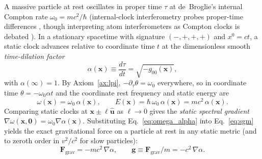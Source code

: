 \documentclass[aps,prd,onecolumn,tightenlines,nofootinbib,notitlepage,10pt,floatfix]{revtex4-2}
\theoremstyle{indentedtheorem}
\begin{document}
A massive particle at rest oscillates in proper time $\tau$ at de~Broglie's internal Compton rate $\omega_0=mc^2/\hbar$ \citep{Compton1923Quantum,deBroglie1925Thesis} (internal-clock interferometry probes proper-time differences \citep{Zych2011Quantum}, though interpreting atom interferometers as Compton clocks is debated \citep{Lan2013Clock,Wolf2011,SinhaSamuel2011}). In a stationary spacetime with signature $(-,+,+,+)$ and $x^0=ct$, a static clock advances relative to coordinate time $t$ at the dimensionless smooth \emph{time-dilation factor} \citep{Einstein1915GR,MTW1973Gravitation}
\begin{equation}
    \alpha(\mathbf{x}) \equiv \frac{d\tau}{dt} = \sqrt{-g_{00}(\mathbf{x})} ,
    \label{eq:alpha_def}
\end{equation}
with $\alpha(\infty)=1$. By Axiom~\ref{ax:lpi}, $-\partial_\tau\theta=\omega_0$ everywhere, so in coordinate time $\theta=-\omega_0\alpha t$ and the coordinate rest frequency and static energy are
\begin{equation}
    \omega(\mathbf{x}) = \omega_0\,\alpha(\mathbf{x}) , \qquad E(\mathbf{x}) = \hbar\,\omega_0\,\alpha(\mathbf{x}) = mc^2\,\alpha(\mathbf{x}) .
    \label{eq:omega_alpha}
\end{equation}
Comparing static clocks at $\mathbf{x}\pm\ell\hat{\mathbf{u}}$ as $\ell\to 0$ gives the \emph{static spectral gradient} $\nabla\omega(\mathbf{x},\mathbf{0})=\omega_0\nabla\alpha(\mathbf{x})$. Substituting Eq.~\eqref{eq:omega_alpha} into Eq.~\eqref{eq:sgm} yields the exact gravitational force on a particle at rest in any static metric (and to zeroth order in $v^2/c^2$ for slow particles):
\begin{equation}
    \mathbf{F}_\text{grav} = -mc^2\,\nabla\alpha , \qquad \mathbf{g} \equiv \mathbf{F}_\text{grav}/m = -c^2\,\nabla\alpha .
    \label{eq:geometric_force}
\end{equation}
\end{document}
